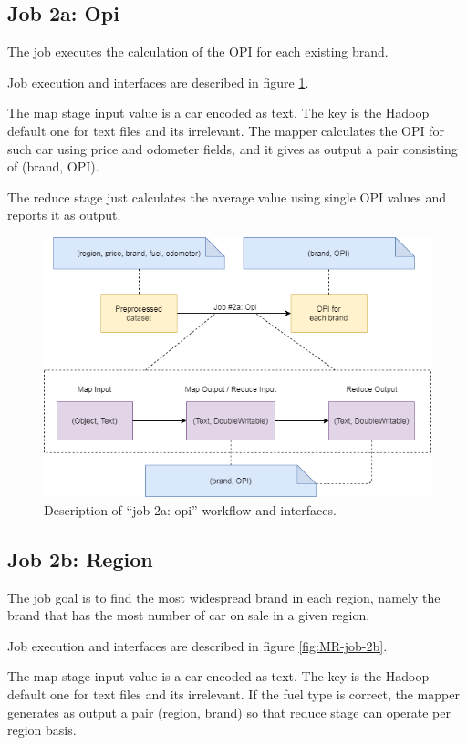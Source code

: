 \subsection{Job 2a: Opi}

The job executes the calculation of the OPI for each existing brand.

Job execution and interfaces are described in figure \ref{fig:MR-job-2a}.

The map stage input value is a car encoded as text. The key is the Hadoop default one for text files and its irrelevant. The mapper calculates the OPI for such car using price and odometer fields, and it gives as output a pair consisting of (brand, OPI).

The reduce stage just calculates the average value using single OPI values and reports it as output.
   
\begin{figure}[H]
	\centering
	\includegraphics[scale=0.7]{images/2-mapreduce/MR-job-2a.png}
	\caption{Description of ``job 2a: opi'' workflow and interfaces.}
	\label{fig:MR-job-2a}
\end{figure}  

\subsection{Job 2b: Region}

The job goal is to find the most widespread brand in each region, namely the brand that has the most number of car on sale in a given region.

Job execution and interfaces are described in figure \ref{fig:MR-job-2b}.

The map stage input value is a car encoded as text. The key is the Hadoop default one for text files and its irrelevant. If the fuel type is correct, the mapper generates as output a pair (region, brand) so that reduce stage can operate per region basis.

